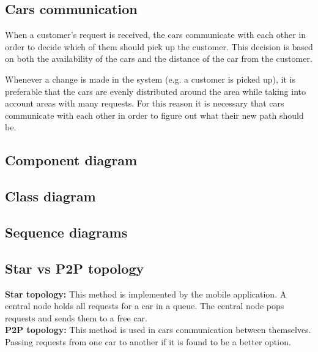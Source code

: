\documentclass[a4paper]{article}
\begin{document}
\subsection*{Cars communication}
When a customer's request is received, the cars communicate with each other in order to decide which of them should pick up the customer. This decision is based on both the availability of the cars and the distance of the car from the customer.

Whenever a change is made in the system (e.g. a customer is picked up), it is preferable that the cars are evenly distributed around the area while taking into account areas with many requests. For this reason it is necessary that cars communicate with each other in order to figure out what their new path should be.
\subsection*{Component diagram}

\subsection*{Class diagram}

\subsection*{Sequence diagrams}

\subsection*{Star vs P2P topology}
\textbf{Star topology:} This method is implemented by the mobile application. A central node holds all requests for a car in a queue. The central node pops requests and sends them to a free car.
\\\textbf{P2P topology:} This method is used in cars communication between themselves. Passing requests from one car to another if it is found to be a better option.
\end{document}
